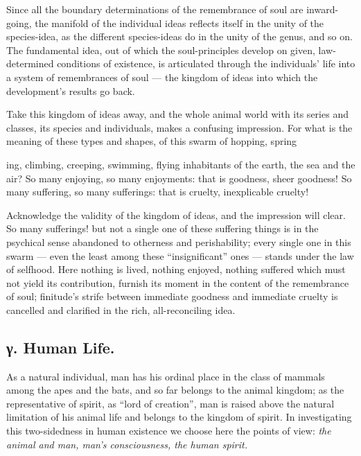 \documentclass[12pt,a4paper]{book}
\begin{document}
Since all the boundary determinations of the remembrance of soul are inward-going, the
manifold of the individual ideas reflects itself in the unity of the species-idea, as
the different species-ideas do in the unity of the genus, and so on. The fundamental
idea, out of which the soul-principles develop on given, law-determined conditions of
existence, is articulated through the individuals' life into a system of remembrances of
soul --- the kingdom of ideas into which the development's results go back.

Take this kingdom of ideas away, and the whole animal world with its series and classes,
its species and individuals, makes a confusing impression. For what is the meaning of
these types and shapes, of this swarm of hopping, spring%

ing, climbing, creeping, swimming, flying inhabitants of the earth, the sea and the
air? So many enjoying, so many enjoyments: that is goodness, sheer goodness! So many
suffering, so many sufferings: that is cruelty, inexplicable cruelty!

Acknowledge the validity of the kingdom of ideas, and the impression will clear. So many
sufferings! but not a single one of these suffering things is in the psychical sense
abandoned to otherness and perishability; every single one in this swarm --- even the
least among these ``insignificant'' ones --- stands under the law of selfhood. Here
nothing is lived, nothing enjoyed, nothing suffered which must not yield its
contribution, furnish its moment in the content of the remembrance of soul; finitude's
strife between immediate goodness and immediate cruelty is cancelled and clarified in
the rich, all-reconciling idea.

\subsection*{γ. Human Life.}

As a natural individual, man has his ordinal place in the class of mammals among the
apes and the bats, and so far belongs to the animal kingdom; as the representative of
spirit, as ``lord of creation'', man is raised above the natural limitation of his
animal life and belongs to the kingdom of spirit. In investigating this two-sidedness
in human existence we choose here the points of view: \emph{the animal and man, man's
consciousness, the human spirit.}
\end{document}
